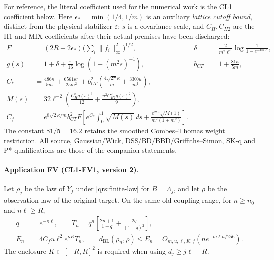 \documentclass[11pt]{article}
\theoremstyle{plain}
\theoremstyle{definition}
\theoremstyle{remark}
\begin{document}
For reference, the literal coefficient used for the numerical work is the
CL1 coefficient below. Here
$\epsilon_*=\min(1/4,1/m)$ is an auxiliary \emph{lattice cutoff bound},
distinct from the physical stabilizer $\varepsilon$; $s$ is a covariance
scale, and $C_H,C_{H2}$ are the H1 and MIX coefficients after their actual
premises have been discharged:
\begin{align}
 \bar F&=(2R+2\epsilon_*)\Big(\sum_i\|f_i\|_\infty^2\Big)^{1/2},
 &\bar\delta&=\frac{2}{m^2\ell^2}\log\frac1{1-e^{-4m\ell}},
 \label{qrs:CL1-data}\\
 g(s)&=1+\bar\delta+\frac\pi{16}\log(1+(m^2s)^{-1}),
 &b_{CT}&=1+\frac{81\kappa}{5m},\nonumber\\
 C_*&=\frac{486\kappa}{5m}+\frac{6561\kappa^2}{25m^2}
       +b_{CT}^2\left(\frac{4\sqrt{2\pi}\kappa}{m}
                         +\frac{3300u}{m^2}\right),\nonumber\\
 M(s)&=32\ell^{-2}\left(\frac{C_H^2g(s)^3}{12}
                          +\frac{u^2C_{H2}^2g(s)^7}{9}\right),\nonumber\\
 C_f&=e^{8\sqrt2\kappa/m}b_{CT}^2\bar F
 \left[e^{C_*}\int_0^1\sqrt{M(s)}\,ds
 +\frac{e^{2C_*}\sqrt{M(1)}}{m^2(1+m^2)}\right].
 \label{qrs:CL1-constant}
\end{align}
The constant $81/5=16.2$ retains the smoothed Combes--Thomas weight
restriction. All source, Gaussian/Wick, DSS/BD/BBD/Griffiths--Simon,
SK-q and P* qualifications are those of the companion statements.

\paragraph{Application FV (CL1-FV1, version 2).}
Let $\rho_j$ be the law of $Y_f$ under \eqref{qrs:finite-law} for
$B=\Lambda_j$, and let $\rho$ be the observation law of the original
target. On the same old coupling range, for $n\ge n_0$ and $n\ell\ge R$,
\begin{align}
 q&=e^{-\kappa\ell},\qquad
 T_n=q^n\left[\frac{2n+1}{1-q}+\frac{2q}{(1-q)^2}\right],\nonumber\\
 E_n&=4C_fu\ell^2e^{\kappa R}T_n,\qquad
 d_{\mathrm{BL}}(\rho_n,\rho)\le E_n
       =O_{m,u,\ell,K,f}(ne^{-m\ell n/256}).
 \label{qrs:FV}
\end{align}
The enclosure $K\subset[-R,R]^2$ is required when using
$d_j\ge j\ell-R$.
\end{document}
